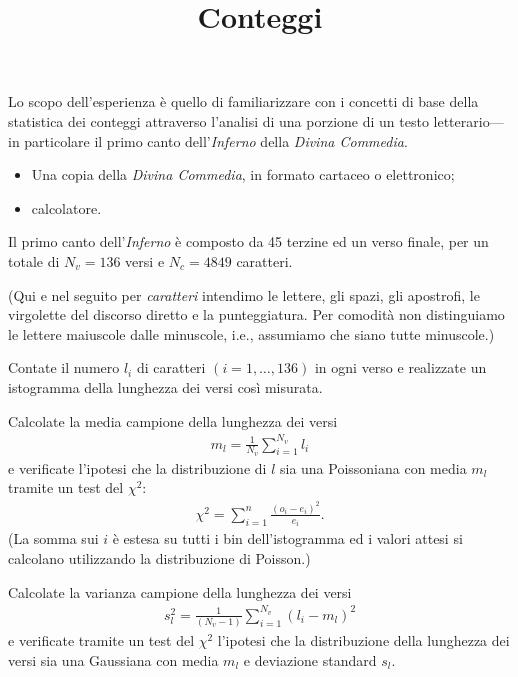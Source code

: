 \documentclass{lab1-article}
\title{Conteggi}
\begin{document}
\begin{article}

\maketitle

\secintro

Lo scopo dell'esperienza \`e quello di familiarizzare con i concetti di base
della statistica dei conteggi attraverso l'analisi di una porzione di un testo
letterario---in particolare il primo canto dell'\emph{Inferno} della
\emph{Divina Commedia}.

\secmaterialsdad

\begin{itemize}
\item Una copia della \emph{Divina Commedia}, in formato cartaceo o elettronico;
\item calcolatore.
\end{itemize}


\secmeasurements

Il primo canto dell'\emph{Inferno} \`e composto da 45 terzine ed un verso finale,
per un totale di $N_v = 136$ versi e $N_c = 4849$ caratteri.

(Qui e nel seguito per \emph{caratteri} intendimo le lettere, gli spazi, gli
apostrofi, le virgolette del discorso diretto e la punteggiatura. Per comodit\`a
non distinguiamo le lettere maiuscole dalle minuscole, i.e., assumiamo che
siano tutte minuscole.)



Contate il numero $l_i$ di caratteri $(i=1, \ldots, 136)$ in ogni verso e
realizzate un istogramma della lunghezza dei versi cos\`i misurata.

Calcolate la media campione della lunghezza dei versi
\begin{align}
  m_l = \frac{1}{N_v} \sum_{i=1}^{N_v} l_i
\end{align}
e verificate l'ipotesi che la distribuzione di $l$ sia una Poissoniana con
media $m_l$ tramite un test del $\chi^2$:
\begin{align}
  \chi^2 = \sum_{i=1}^{n} \frac{(o_i - e_i)^2}{e_i}.
\end{align}
(La somma sui $i$ \`e estesa su tutti i bin dell'istogramma ed i valori
attesi si calcolano utilizzando la distribuzione di Poisson.)


Calcolate la varianza campione della lunghezza dei versi
\begin{align}
  s^2_l = \frac{1}{(N_v - 1)} \sum_{i=1}^{N_v} (l_i - m_l)^2
\end{align}
e verificate tramite un test del $\chi^2$ l'ipotesi che la distribuzione
della lunghezza dei versi sia una Gaussiana con media $m_l$ e
deviazione standard $s_l$.


\end{article}
\end{document}
